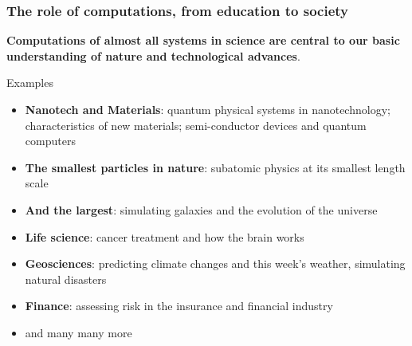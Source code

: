 \documentclass{beamer}
\begin{document}
\begin{frame}
\frametitle{The role of computations, from education to society}

\pause
\begin{block}{}
\textbf{Computations of almost all systems in science are central to our
basic understanding of nature and technological advances}.
\end{block}

\begin{block}{Examples }
\begin{itemize}
\item \textbf{Nanotech and Materials}: quantum physical systems in nanotechnology; characteristics of new materials; semi-conductor devices and quantum computers

\item \textbf{The smallest particles in nature}: subatomic physics at its smallest length scale

\item \textbf{And the largest}: simulating galaxies and the evolution of the universe

\item \textbf{Life science}: cancer treatment and how the brain works

\item \textbf{Geosciences}: predicting climate changes and this week's weather, simulating natural disasters

\item \textbf{Finance}: assessing risk in the insurance and financial industry

\item and many many more
\end{itemize}

\noindent
\end{block}
\end{frame}
\end{document}
